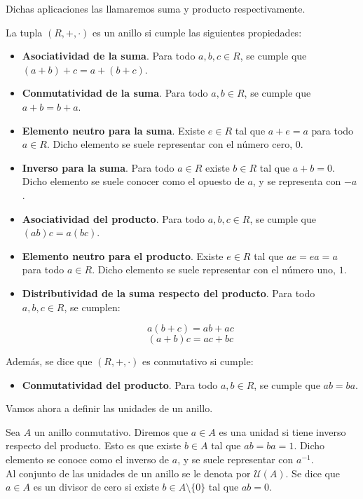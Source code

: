 Dichas aplicaciones las llamaremos suma y producto respectivamente.

\begin{definicion}
	La tupla $(R, +, \cdot)$ es un anillo si cumple las siguientes propiedades:
	
	\begin{itemize}
		\item \textbf{Asociatividad de la suma}. Para todo $a, b, c \in R$, se cumple que $(a + b) + c = a + (b + c)$.
		
		\item \textbf{Conmutatividad de la suma}. Para todo $a, b \in R$, se cumple que $a + b = b + a$.
		
		\item \textbf{Elemento neutro para la suma}. Existe $e \in R$ tal que $a + e = a$ para todo $a \in R$. Dicho elemento se suele representar con el número cero, $0$.
		
		\item \textbf{Inverso para la suma}. Para todo $a \in R$ existe $b \in R$ tal que $a + b = 0$. Dicho elemento se suele conocer como el opuesto de $a$, y se representa con $-a$.
		
		\item \textbf{Asociatividad del producto}. Para todo $a, b, c \in R$, se cumple que $(ab)c = a(bc)$.
		
		\item \textbf{Elemento neutro para el producto}. Existe $e \in R$ tal que $ae = ea = a$ para todo $a \in R$. Dicho elemento se suele representar con el número uno, $1$.
		
		\item \textbf{Distributividad de la suma respecto del producto}. Para todo $a, b, c \in R$, se cumplen:
		
		\[ a(b + c) = ab + ac \]
		\[ (a + b)c = ac + bc \]
	\end{itemize}
	
	Además, se dice que $(R, +, \cdot)$ es conmutativo si cumple:
	
	\begin{itemize}
		\item \textbf{Conmutatividad del producto}. Para todo $a, b \in R$, se cumple que $ab = ba$.
	\end{itemize}
\end{definicion}

Vamos ahora a definir las unidades de un anillo.

\begin{definicion}
	Sea $A$ un anillo conmutativo. Diremos que $a \in A$ es una unidad si tiene inverso respecto del producto. Esto es que existe $b \in A$ tal que $ab = ba = 1$. Dicho elemento se conoce como el inverso de $a$, y se suele representar con $a^{-1}$.\\
	
	Al conjunto de las unidades de un anillo se le denota por $\mathcal{U}(A)$. Se dice que $a \in A$ es un divisor de cero si existe $b \in A \setminus \{0\}$ tal que $ab = 0$.
\end{definicion}

